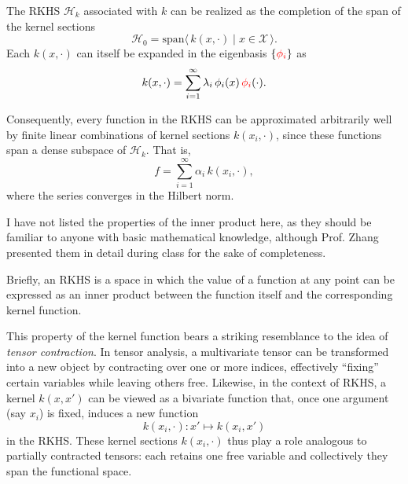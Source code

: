 \documentclass[../main]{subfiles}
\begin{document}
\begin{note}
    \begin{proposition}
        The RKHS $\mathcal{H}_k$ associated with $k$ can be realized as the completion of the span of the kernel sections
        \begin{equation}
            \mathcal{H}_0 = \mathrm{span}\langle\,k(x, \cdot)\mid x \in \mathcal{X}\,\rangle.
        \end{equation}
        Each $k(x, \cdot)$ can itself be expanded in the eigenbasis $\{\color{red}\phi_i\color{black}\}$ as
        \begin{equation}
            k(x, \cdot) = \sum_{i=1}^{\infty} \lambda_i\, \phi_i(x)\, \color{red}\phi_i\color{black}(\cdot).
        \end{equation}
    \end{proposition}

    Consequently, every function in the RKHS can be approximated arbitrarily well by 
    finite linear combinations of kernel sections $k(x_i, \cdot)$, since these functions span a 
    dense subspace of $\mathcal{H}_k$.  
    That is,
    \begin{equation}
        f = \sum_{i=1}^{\infty} \alpha_i\, k(x_i, \cdot),
    \end{equation}
    where the series converges in the Hilbert norm.
    \end{note}
    \begin{note}
        I have not listed the properties of the inner product here, as they should be familiar to anyone with basic mathematical knowledge, although Prof. Zhang presented them in detail during class for the sake of completeness.
    \end{note}
\vspace{1em}
Briefly, an RKHS is a space in which the value of a function at any point can be expressed as an inner product between the function itself and the corresponding kernel function.
\begin{note}
    This property of the kernel function bears a striking resemblance to the idea of
    \emph{tensor contraction}.  
    In tensor analysis, a multivariate tensor can be transformed into a new object by
    contracting over one or more indices, effectively ``fixing'' certain variables while
    leaving others free.  
    Likewise, in the context of RKHS, a kernel $k(x, x')$ can be viewed as a bivariate
    function that, once one argument (say $x_i$) is fixed, induces a new function
    \begin{equation}
        k(x_i, \cdot): x' \mapsto k(x_i, x')
    \end{equation}
    in the RKHS.  
    These kernel sections $k(x_i, \cdot)$ thus play a role analogous to partially contracted
    tensors: each retains one free variable and collectively they span the functional space.
\end{note}
\end{document}
